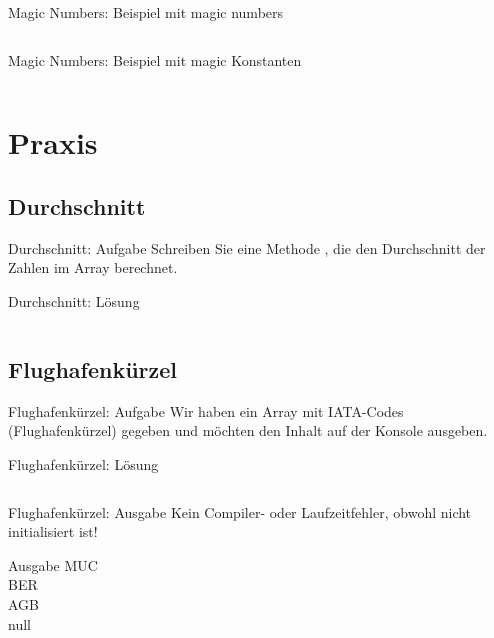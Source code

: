\documentclass[usepdftitle=false,hyperref={pdfpagelabels=false}]{beamer}
\begin{document}
\begin{frame}{Magic Numbers: Beispiel mit magic numbers}
    \inputminted[linenos=true, numbersep=5pt, tabsize=4, fontsize=\tiny]{java}{ConnectFourGame-bad.java}
\end{frame}

\begin{frame}{Magic Numbers: Beispiel mit magic Konstanten}
    \inputminted[linenos=true, numbersep=5pt, tabsize=4, fontsize=\tiny]{java}{ConnectFourGame.java}
\end{frame}

\section{Praxis}
\subsection{Durchschnitt}
\begin{frame}{Durchschnitt: Aufgabe}
    Schreiben Sie eine Methode ,
    die den Durchschnitt der Zahlen im Array  berechnet.
\end{frame}

\begin{frame}{Durchschnitt: Lösung}
    \inputminted[linenos=true, numbersep=5pt, tabsize=4, fontsize=\small]{java}{AverageCalculation.java}
\end{frame}

\subsection{Flughafenkürzel}
\begin{frame}{Flughafenkürzel: Aufgabe}
    Wir haben ein Array mit IATA-Codes (Flughafenkürzel) gegeben und 
    möchten den Inhalt auf der Konsole ausgeben.
\end{frame}

\begin{frame}{Flughafenkürzel: Lösung}
    \inputminted[linenos=true, numbersep=5pt, tabsize=4, fontsize=\small]{java}{IataCode.java}
\end{frame}

\begin{frame}{Flughafenkürzel: Ausgabe}
    Kein Compiler- oder Laufzeitfehler, obwohl 
    nicht initialisiert ist!

    \begin{block}{Ausgabe}
    MUC\\
    BER\\
    AGB\\
    null
    \end{block}
\end{frame}
\end{document}
